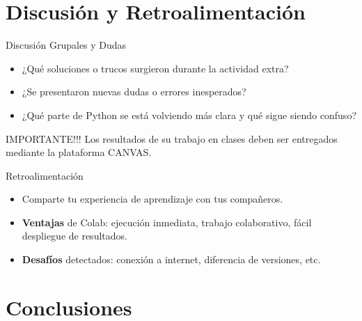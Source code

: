 \documentclass[10pt]{beamer}
\begin{document}
\section{Discusión y Retroalimentación}

\begin{frame}{Discusión Grupales y Dudas}
  \begin{itemize}
    \item ¿Qué soluciones o trucos surgieron durante la actividad extra?
    \item ¿Se presentaron nuevas dudas o errores inesperados?
    \item ¿Qué parte de Python se está volviendo más clara y qué sigue siendo confuso?
  \end{itemize}
  \begin{block}{IMPORTANTE!!!}
    Los resultados de su trabajo en clases deben ser entregados mediante la plataforma CANVAS.
  \end{block}
\end{frame}

\begin{frame}{Retroalimentación}
  \begin{itemize}
    \item Comparte tu experiencia de aprendizaje con tus compañeros.
    \item \textbf{Ventajas} de Colab: ejecución inmediata, trabajo colaborativo, fácil despliegue de resultados.
    \item \textbf{Desafíos} detectados: conexión a internet, diferencia de versiones, etc.
  \end{itemize}
\end{frame}

\section{Conclusiones}
\end{document}

